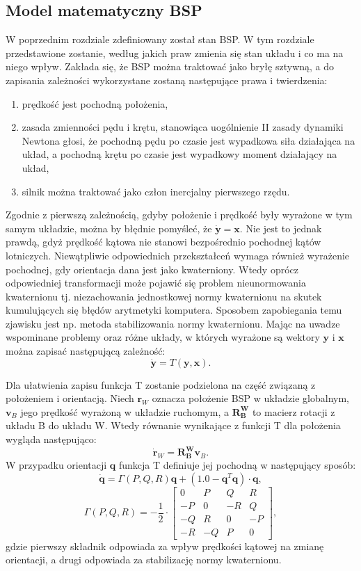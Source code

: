 \subsection{Model matematyczny BSP}

W poprzednim rozdziale zdefiniowany został stan BSP. W tym rozdziale przedstawione zostanie, według jakich praw zmienia się stan układu i co ma na niego wpływ. Zakłada się, że BSP można traktować jako bryłę sztywną, a do zapisania zależności wykorzystane zostaną następujące prawa i twierdzenia:

\begin{enumerate}
\item prędkość jest pochodną położenia,
\item zasada zmienności pędu i krętu, stanowiąca uogólnienie II zasady dynamiki Newtona głosi, że pochodną pędu po czasie jest wypadkowa siła działająca na układ, a pochodną krętu po czasie jest wypadkowy moment działający na układ,
\item silnik można traktować jako człon inercjalny pierwszego rzędu.
\end{enumerate}

Zgodnie z pierwszą zależnością, gdyby położenie i prędkość były wyrażone w tym samym układzie, można by błędnie pomyśleć, że $\bm{\dot{y}} = \bm{x}$. Nie jest to jednak prawdą, gdyż prędkość kątowa nie stanowi bezpośrednio pochodnej kątów lotniczych. Niewątpliwie odpowiednich przekształceń wymaga również wyrażenie pochodnej, gdy orientacja dana jest jako kwaterniony. Wtedy oprócz odpowiedniej transformacji może pojawić się problem nieunormowania kwaternionu tj. niezachowania jednostkowej normy kwaternionu na skutek kumulujących się błędów arytmetyki komputera. Sposobem zapobiegania temu zjawisku jest np. metoda stabilizowania normy kwaternionu. Mając na uwadze wspominane problemy oraz różne układy, w których wyrażone są wektory $\bm{y}$ i $\bm{x}$ można zapisać następującą zależność:
\[
	\bm{\dot{y}} = T(\bm{y}, \bm{x}).
\]

Dla ułatwienia zapisu funkcja T zostanie podzielona na część związaną z położeniem i orientacją. Niech $\bm{r}_W$ oznacza położenie BSP w układzie globalnym, $\bm{v}_B$ jego prędkość wyrażoną w układzie ruchomym, a $\bm{R_B^W}$ to macierz rotacji z układu B do układu W. Wtedy równanie wynikające z funkcji T dla położenia wygląda następująco:
\[
	\bm{\dot{r}}_W = \bm{R_B^W} \bm{v}_B.
\]
W przypadku orientacji $\bm{q}$ funkcja T definiuje jej pochodną w następujący sposób:
\[
	\bm{\dot{q}} = 	\Gamma(P,Q,R) \bm{q} +\left ( 1.0 - \bm{q}^T \bm{q} \right) \cdot \bm{q},
\]
\[
	\Gamma(P,Q,R) = - \frac{1}{2} \cdot \begin{bmatrix}
	0 & P & Q & R \\ -P & 0 & -R & Q \\ -Q & R & 0 & -P \\ -R & -Q & P & 0
	\end{bmatrix},
\]
gdzie pierwszy składnik odpowiada za wpływ prędkości kątowej na zmianę orientacji, a drugi odpowiada za stabilizację normy kwaternionu.\\

